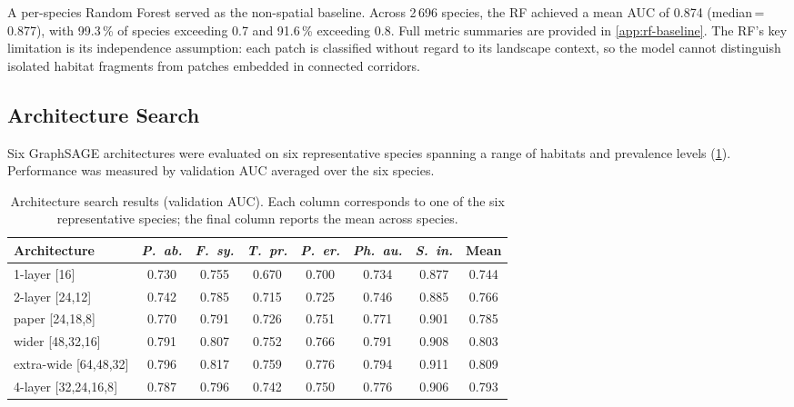 A per-species Random Forest served as the non-spatial baseline.
Across 2\,696 species, the RF achieved a mean AUC of 0.874
(median\,=\,0.877), with 99.3\,\% of species exceeding 0.7 and
91.6\,\% exceeding 0.8. Full metric summaries are provided in
\cref{app:rf-baseline}. The RF's key limitation is its
independence assumption: each patch is classified without regard
to its landscape context, so the model cannot distinguish isolated
habitat fragments from patches embedded in connected corridors.

\subsection{Architecture Search}
\label{sec:arch-results}

Six GraphSAGE architectures were evaluated on six
representative species spanning a range of habitats and
prevalence levels (\cref{tab:arch-search}).  Performance was
measured by validation AUC averaged over the six species.

\begin{table}[htbp]
  \centering
  \caption{Architecture search results (validation AUC). Each
  column corresponds to one of the six representative species;
  the final column reports the mean across species.}
  \label{tab:arch-search}
  \small
  \begin{tabular}{lcccccc|c}
    \toprule
    Architecture & \textit{P.~ab.} & \textit{F.~sy.}
      & \textit{T.~pr.} & \textit{P.~er.}
      & \textit{Ph.~au.} & \textit{S.~in.} & Mean \\
    \midrule
    1-layer {[}16{]}        & 0.730 & 0.755 & 0.670
      & 0.700 & 0.734 & 0.877 & 0.744 \\
    2-layer {[}24,12{]}     & 0.742 & 0.785 & 0.715
      & 0.725 & 0.746 & 0.885 & 0.766 \\
    paper {[}24,18,8{]}     & 0.770 & 0.791 & 0.726
      & 0.751 & 0.771 & 0.901 & 0.785 \\
    wider {[}48,32,16{]}    & 0.791 & 0.807 & 0.752
      & 0.766 & 0.791 & 0.908 & 0.803 \\
    extra-wide {[}64,48,32{]} & 0.796 & 0.817 & 0.759
      & 0.776 & 0.794 & 0.911 & 0.809 \\
    4-layer {[}32,24,16,8{]} & 0.787 & 0.796 & 0.742
      & 0.750 & 0.776 & 0.906 & 0.793 \\
    \bottomrule
  \end{tabular}
\end{table}

